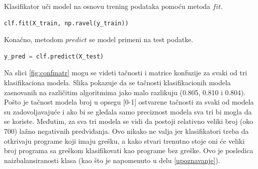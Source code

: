 \documentclass[12pt,oneside]{memoir}
\begin{document}
Klasifikator uči model na osnovu trening podataka pomoću metoda $fit$. 
\begin{lstlisting}[language=Python, basicstyle=\tiny]
	clf.fit(X_train, np.ravel(y_train))
\end{lstlisting}

Konačno, metodom $predict$ se model primeni na test podatke.
\begin{lstlisting}[language=Python, basicstyle=\tiny]
	y_pred = clf.predict(X_test)
\end{lstlisting}

Na slici \ref{fig:confmatr} mogu se videti tačnosti i matrice konfuzije za svaki od tri klasifikaciona modela. Slika pokazuje da se tačnosti klasifikacionih modela zasnovanih na različitim algoritmima jako malo razlikuju (0.805, 0.810 i 0.804). Pošto je tačnost modela broj u opsegu [0-1] ostvarene tačnosti za svaki od modela su zadovoljavajuće i ako bi se gledala samo preciznost modela sva tri bi mogla da se koriste. Međutim, za sva tri modela se vidi da postoji relativno veliki broj (oko 700) lažno negativnih predviđanja. Ovo nikako ne valja jer klasifikatori treba da otkrivaju programe koji imaju grešku, a kako stvari trenutno stoje oni će veliki broj programa sa greškom klasifikovati kao programe bez greške. Ovo je posledica naizbalansiranosti klasa (kao što je napomenuto u delu \ref{upoznavanje}). 
\end{document}
